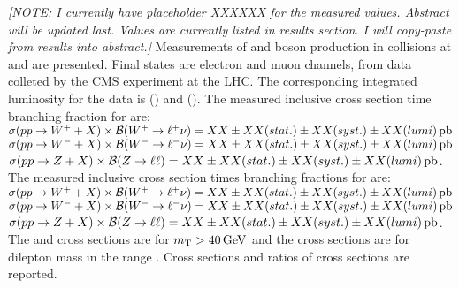 % 
% 
%

\textit{[NOTE: I currently have placeholder XXXXXX for the measured values. Abstract will be updated last. Values are currently listed in results section. I will copy-paste from results into abstract.]}
Measurements of \W and \Z boson production in \pp collisions at \sg and \sh are presented. Final states are electron and muon channels, from data colleted by the CMS experiment at the LHC. The corresponding integrated luminosity for the data is \lumig (\sg) and \lumih (\sh). The measured inclusive cross section time branching fraction for \sg are: \\
$\sigma(pp\to W^++X)\times\mathcal{B}(W^+\to \ell^+ \nu) = XX \pm XX (stat.) \pm XX (syst.) \pm XX (lumi) \,\mathrm{pb}$
$\sigma(pp\to W^-+X)\times\mathcal{B}(W^-\to \ell^- \nu) = XX \pm XX (stat.) \pm XX (syst.) \pm XX (lumi) \,\mathrm{pb}$
$\sigma(pp\to Z+X)\times\mathcal{B}(Z\to \ell \ell) = XX \pm XX (stat.) \pm XX (syst.) \pm XX (lumi) \,\mathrm{pb}$. \\
The measured inclusive cross section times branching fractions for \sh are:\\
$\sigma(pp\to W^++X)\times\mathcal{B}(W^+\to \ell^+ \nu) = XX \pm XX (stat.) \pm XX (syst.) \pm XX (lumi) \,\mathrm{pb}$
$\sigma(pp\to W^-+X)\times\mathcal{B}(W^-\to \ell^- \nu) = XX \pm XX (stat.) \pm XX (syst.) \pm XX (lumi) \,\mathrm{pb}$
$\sigma(pp\to Z+X)\times\mathcal{B}(Z\to \ell \ell) = XX \pm XX (stat.) \pm XX (syst.) \pm XX (lumi) \,\mathrm{pb}$. \\
The \Wp and \Wm cross sections are for $m_{\mathrm{T}} > 40 \,\text{Ge\hspace{-.08em}V}$ and the \Z cross sections are for dilepton mass in the range \masswindow. Cross sections and ratios of cross sections are reported. 